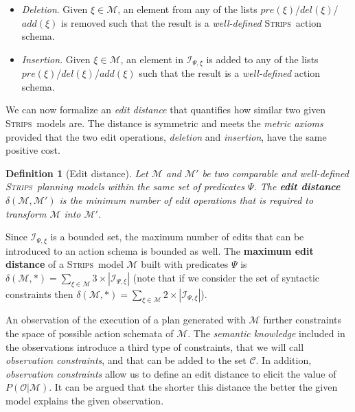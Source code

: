 \documentclass[letterpaper]{article} %
\newcommand{\strips}{\textsc{Strips}}     %
\newtheorem{definition}[theorem]{Definition}
\begin{document}
\begin{itemize}
\item {\em Deletion}. Given $\xi\in\mathcal{M}$, an element from any of the lists $pre(\xi)$/$del(\xi)$/$add(\xi)$ is removed such that the result is a {\em well-defined} \strips\ action schema.
\item {\em Insertion}. Given $\xi\in\mathcal{M}$, an element in ${\mathcal I}_{\Psi,\xi}$ is added to any of the lists $pre(\xi)$/$del(\xi)$/$add(\xi)$ such that the result is a {\em well-defined} action schema.
\end{itemize}

We can now formalize an {\em edit distance} that quantifies how similar two given \strips\ models are. The distance is symmetric and meets the {\em metric axioms} provided that the two edit operations, {\em deletion} and {\em insertion}, have the same positive cost.

\begin{definition}[Edit distance]
  Let $\mathcal{M}$ and $\mathcal{M}'$ be two {\em comparable} and {\em well-defined} \strips\ planning models within the same set of predicates $\Psi$. The {\bf edit distance} $\delta(\mathcal{M},\mathcal{M}')$ is the minimum number of {\em edit operations} that is required to transform $\mathcal{M}$ into $\mathcal{M}'$.
\end{definition}

Since ${\mathcal I}_{\Psi,\xi}$ is a bounded set, the maximum number of edits that can be introduced to an action schema is bounded as well. The \textbf{maximum edit distance} of a \strips\ model $\mathcal{M}$ built with predicates $\Psi$ is $\delta(\mathcal{M},*)=\sum_{\xi\in\mathcal{M}} 3\times|{\mathcal I}_{\Psi,\xi}|$ (note that if we consider the set of syntactic constraints then $\delta(\mathcal{M},*)=\sum_{\xi\in\mathcal{M}} 2\times|{\mathcal I}_{\Psi,\xi}|$).


An observation of the execution of a plan generated with $\mathcal{M}$ further constraints the space of possible action schemata of $\mathcal{M}$. The \emph{semantic knowledge} included in the observations introduce a third type of constraints, that we will call {\em observation constraints}, and that can be added to the set $\mathcal{C}$. In addition, {\em observation constraints} allow us to define an edit distance to elicit the value of $P(\mathcal{O}|\mathcal{M})$. It can be argued that the shorter this distance the better the given model explains the given observation.
\end{document}
